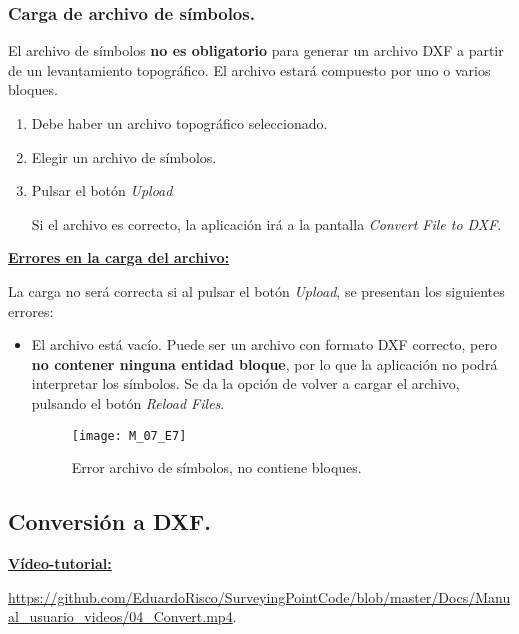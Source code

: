 \subsubsection{Carga de archivo de símbolos.}

El archivo de símbolos \textbf{no es obligatorio} para generar un archivo DXF a partir de un levantamiento topográfico. El archivo estará compuesto por uno o varios bloques.

\begin{enumerate}

\item Debe haber un archivo topográfico seleccionado.
\item Elegir un archivo de símbolos.
\item Pulsar el botón \emph{Upload}

Si el archivo es correcto, la aplicación irá a la pantalla \emph{Convert File to DXF}.

\end{enumerate}

\textbf{\underline{Errores en la carga del archivo:} } 

La carga no será correcta si al pulsar el botón \emph{Upload}, se presentan los siguientes errores:

\begin{itemize}


\item El archivo está vacío. Puede ser un archivo con formato DXF correcto, pero \textbf{no contener ninguna entidad bloque}, por lo que la aplicación no podrá interpretar los símbolos. Se da la opción de volver a cargar el archivo, pulsando el botón \emph{Reload Files}.

\begin{figure}[H]
	\centering
	\texttt{[image: M\_07\_E7]}
	\caption{Error archivo de símbolos, no contiene bloques.}
	\label{fig:M_07_E7}
\end{figure}

\end{itemize}

\subsection{Conversión a DXF.}

\textbf{\underline{Vídeo-tutorial:}}

\url{https://github.com/EduardoRisco/SurveyingPointCode/blob/master/Docs/Manual_usuario_videos/04_Convert.mp4}.

